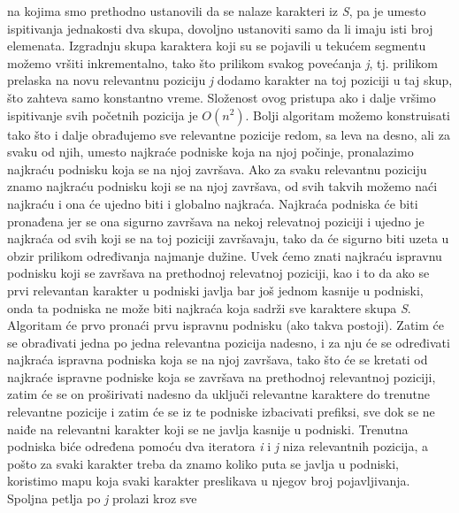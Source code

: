 \documentclass{article}
\begin{document}
na kojima smo prethodno ustanovili da se nalaze karakteri iz \textit{S}, pa je umesto
ispitivanja jednakosti dva skupa, dovoljno ustanoviti samo da li imaju isti broj
elemenata. Izgradnju skupa karaktera
koji su se pojavili u tekućem segmentu možemo vršiti inkrementalno, tako što
prilikom svakog povećanja \textit{j}, tj. prilikom prelaska na novu relevantnu poziciju \textit{j}
dodamo karakter na toj poziciji u taj skup, što zahteva samo konstantno vreme. Složenost ovog pristupa ako i dalje vršimo
ispitivanje svih početnih pozicija je $O(n^2)$.
\newline
Bolji algoritam možemo konstruisati tako što i dalje obrađujemo sve relevantne
pozicije redom, sa leva na desno, ali za svaku od njih, umesto najkraće podniske
koja na njoj počinje, pronalazimo najkraću podnisku koja se na njoj završava. Ako za
svaku relevantnu poziciju znamo najkraću podnisku koji se na njoj završava,
od svih takvih možemo naći najkraću i ona će ujedno biti i globalno najkraća.
\vspace{0.4cm}\newline
Najkraća podniska će biti pronađena jer
se ona sigurno završava na nekoj relevatnoj poziciji i ujedno je najkraća od svih
koji se na toj poziciji završavaju, tako da će sigurno biti uzeta u obzir prilikom
određivanja najmanje dužine. Uvek ćemo znati najkraću ispravnu podnisku koji se završava na prethodnoj relevatnoj
poziciji, kao i to da ako se prvi relevantan karakter u podniski javlja bar još
jednom kasnije u podniski, onda ta podniska ne može biti najkraća koja sadrži
sve karaktere skupa \textit{S}.
\newline
Algoritam će prvo pronaći prvu ispravnu podnisku (ako takva postoji). Zatim će
se obrađivati jedna po jedna relevantna pozicija nadesno, i za nju će se određivati
najkraća ispravna podniska koja se na njoj završava, tako što će se kretati od
najkraće ispravne podniske koja se završava na prethodnoj relevantnoj poziciji,
zatim će se on proširivati nadesno da uključi relevantne karaktere do trenutne
relevantne pozicije i zatim će se iz te podniske izbacivati prefiksi, sve dok se ne
naiđe na relevantni karakter koji se ne javlja kasnije u podniski.
\newline
Trenutna podniska biće određena pomoću dva iteratora \textit{i} i \textit{j} niza relevantnih
pozicija, a pošto za svaki karakter treba da znamo koliko puta se javlja u podniski,
koristimo mapu koja svaki karakter preslikava u njegov broj pojavljivanja.
\newline
Spoljna petlja po \textit{j} prolazi kroz sve
\end{document}
